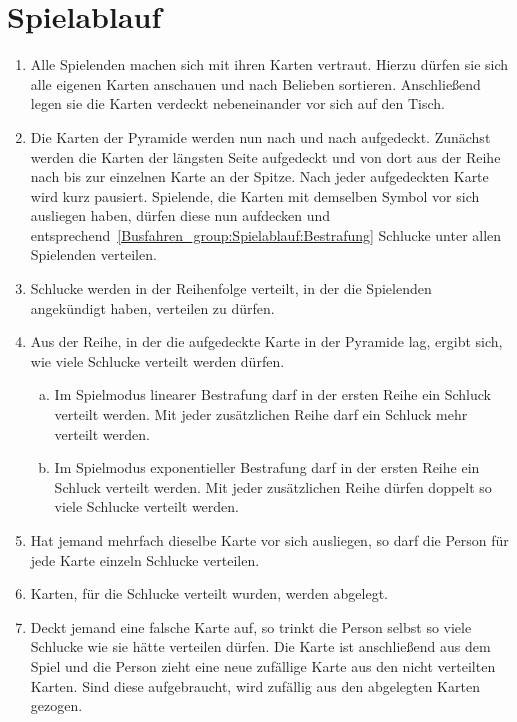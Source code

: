 \section{Spielablauf}\label{Busfahren_group:Spielablauf}
\begin{enumerate}[label={(\arabic*)}]
    \item
    Alle Spielenden machen sich mit ihren Karten vertraut.
    Hierzu dürfen sie sich alle eigenen Karten anschauen und nach Belieben sortieren.
    Anschließend legen sie die Karten verdeckt nebeneinander vor sich auf den Tisch.

    \item
    Die Karten der Pyramide werden nun nach und nach aufgedeckt.
    Zunächst werden die Karten der längsten Seite aufgedeckt und von dort aus der Reihe nach bis zur einzelnen Karte an der Spitze.
    Nach jeder aufgedeckten Karte wird kurz pausiert.
    Spielende, die Karten mit demselben Symbol vor sich ausliegen haben, dürfen diese nun aufdecken und entsprechend~\ref{Busfahren_group:Spielablauf:Bestrafung} Schlucke unter allen Spielenden verteilen.

    \item Schlucke werden in der Reihenfolge verteilt, in der die Spielenden angekündigt haben, verteilen zu dürfen.

    \item\label{Busfahren_group:Spielablauf:Bestrafung}
    Aus der Reihe, in der die aufgedeckte Karte in der Pyramide lag, ergibt sich, wie viele Schlucke verteilt werden dürfen.
    \begin{enumerate}[a.]
        \item
        Im Spielmodus linearer Bestrafung darf in der ersten Reihe ein Schluck verteilt werden.
        Mit jeder zusätzlichen Reihe darf ein Schluck mehr verteilt werden.
        \item
        Im Spielmodus exponentieller Bestrafung darf in der ersten Reihe ein Schluck verteilt werden.
        Mit jeder zusätzlichen Reihe dürfen doppelt so viele Schlucke verteilt werden.
    \end{enumerate}

    \item 
    Hat jemand mehrfach dieselbe Karte vor sich ausliegen, so darf die Person für jede Karte einzeln Schlucke verteilen.

    \item
    Karten, für die Schlucke verteilt wurden, werden abgelegt.

    \item\label{Busfahren_group:Spielablauf:Ziehen}
    Deckt jemand eine falsche Karte auf, so trinkt die Person selbst so viele Schlucke wie sie hätte verteilen dürfen.
    Die Karte ist anschließend aus dem Spiel und die Person zieht eine neue zufällige Karte aus den nicht verteilten Karten.
    Sind diese aufgebraucht, wird zufällig aus den abgelegten Karten gezogen.


\end{enumerate}
